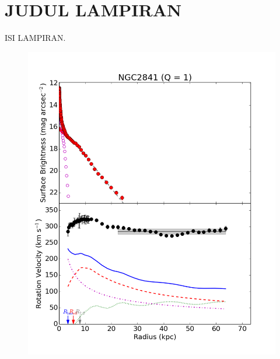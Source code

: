\chapter{JUDUL LAMPIRAN}
\vspace{1.0cm}

ISI LAMPIRAN.

\begin{figure}[H]
\centering 
\includegraphics[scale=0.5]{pics/lamp1.png}
\end{figure}

